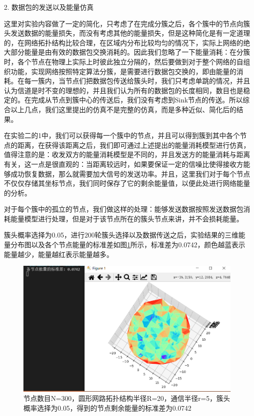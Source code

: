 \documentclass[UTF8]{article} %
\begin{document}
	 
	2. 数据包的发送以及能量仿真
	
	这里对实验内容做了一定的简化，只考虑了在完成分簇之后，各个簇中的节点向簇头发送数据的能量损失，而没有考虑其他的能量损失，但是这种简化是有一定道理的，在网络拓扑结构比较合理，在区域内分布比较均匀的情况下，实际上网络的绝大部分能量是由有效的数据包交换消耗的。因此我们忽略了一下能量消耗：在分簇时，各个节点在物理上实际上时彼此独立分隔的，然后要做到对于整个网络的自组织功能，实现网络按照特定算法分簇，是需要进行数据包交换的，即由能量的消耗。在每一簇内，当节点们把数据包传送给簇头时，我们只考虑单跳的情况，并且认为信道是时不变的理想的，并且我们认为所有的数据包的长度相同，数目也是稳定的。在完成从节点到簇中心的传送后，我们没有考虑到Sink节点的传送。所以综合以上几点，我们这里提出的仿真不是完整的仿真，而是多种近似、简化后的结果。
	
	在实验二的1中，我们可以获得每一个簇中的节点，并且可以得到簇到其中各个节点的距离，在获得该距离之后，我们即可通过上述提出的能量消耗模型进行仿真，值得注意的是：收发双方的能量消耗模型是不同的，并且发送方的能量消耗与距离有关，这一点是很直观的：当距离较远时，如果要保证一定的信噪比使得接收方能够成功恢复数据，那么就需要加大信号的发送功率。并且，这里我们对于每个节点不仅仅存储其坐标节点，我们同时保存了它的剩余能量值，以便此处进行网络能量的分析。
	
	对于每个簇中的孤立的节点，我们做这样的处理：能够发送数据按照发送数据包消耗能量模型进行处理，但是对于该节点所在的簇头节点来讲，并不会损耗能量。
	
	簇头概率选择为0.05，进行200轮簇头选择以及数据传送之后，实验结果的三维能量分布图以及各个节点能量的标准差如图\ref{fig:figure3}所示，标准差为0.0742，颜色越蓝表示能量越少，能量越红表示能量越多。
	\begin{figure}[H]
		\centering
		\includegraphics[width=0.7\linewidth]{screenshot006}
		\caption{节点数目N=300，圆形网路拓扑结构半径R=20，通信半径r=5，簇头概率选择为0.05，得到的节点剩余能量的标准差为0.0742}
		\label{fig:figure3}
	\end{figure}
\end{document}

